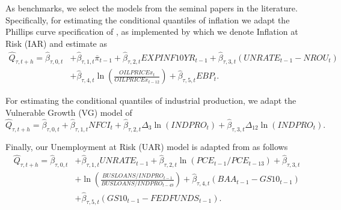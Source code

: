 \documentclass[12pt]{article}
\begin{document}
As benchmarks, we select the models from the seminal papers in the literature. Specifically, for estimating the conditional quantiles of inflation we adapt the Phillips curve specification of \cite{blanchardNBERWORKINGPAPER}, as implemented by \cite{lopez-salidoInflationRisk2024}
which we denote Inflation at Risk (IAR) and estimate as 
\begin{equation}\label{eq: IAR}
  \begin{aligned}
    \hat Q_{\tau,t+h} = \hat \beta_{\tau,0,t} &+  \hat \beta_{\tau,1,t} \overline{\pi}_{t-1} + \hat \beta_{\tau,2,t} EXPINF10YR_{t-1} + \hat \beta_{\tau,3,t} (UNRATE_{t-1} - NROU_t) \\  
    &+ \hat\beta_{\tau,4,t} \ln\left(\frac{OILPRICEx_t}{OILPRICEx_{t-12}}\right) + \hat\beta_{\tau,5,t} EBP_t.
  \end{aligned}
\end{equation}

For estimating the conditional quantiles of industrial production, we adapt the Vulnerable Growth (VG) model of \cite{adrianVulnerableGrowth2019}
\begin{equation}\label{eq: VG}
  \hat Q_{\tau,t+h} = \hat\beta_{\tau,0,t} + \hat\beta_{\tau,1,t} NFCI_t + \hat\beta_{\tau,2,t} \Delta_3\ln(INDPRO_t) + \hat\beta_{\tau,3,t} \Delta_{12} \ln(INDPRO_t).
\end{equation}

Finally, our Unemployment at Risk (UAR) model is adapted from \cite{kileyUnemploymentRisk2022} as follows
\begin{equation}\label{eq: UAR}
  \begin{aligned}
    \hat Q_{\tau,t+h} = \hat \beta_{\tau,0,t} &+  \hat \beta_{\tau,1,t} UNRATE_{t-1} + \hat \beta_{\tau,2,t} \ln\left( PCE_{t-1} / PCE_{t-13} \right) + \hat \beta_{\tau,3,t}  \\ &+ \ln \left( \frac{BUSLOANS/INDPRO_{t-1}}{BUSLOANS/INDPRO_{t-49}} \right) + \hat\beta_{\tau,4,t} (BAA_{t-1} - GS10_{t-1}) \\ &+ \hat\beta_{\tau,5,t} (GS10_{t-1} - FEDFUNDS_{t-1}).
  \end{aligned}
\end{equation}
\end{document}
